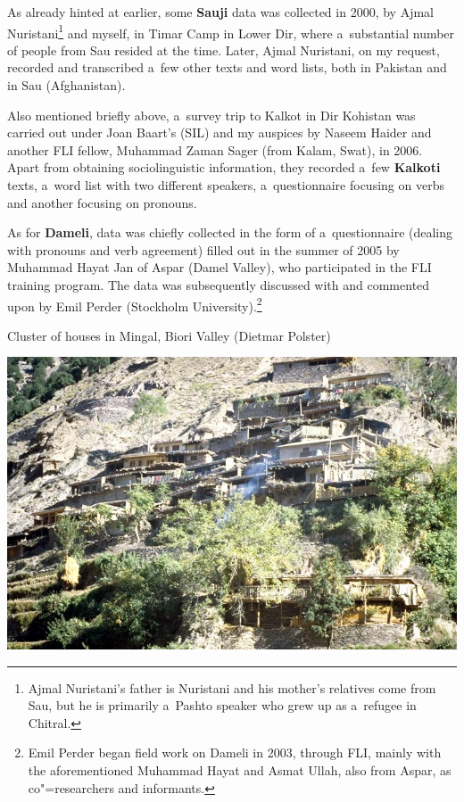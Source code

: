As already hinted at earlier, some \textbf{Sauji} data was collected in 2000, by Ajmal
Nuristani\footnote{Ajmal Nuristani's father is Nuristani and his mother's relatives come from Sau,
  but he is primarily a~Pashto speaker who grew up as a~refugee in Chitral.} and myself, in Timar
Camp in Lower Dir, where a~substantial number of people from Sau resided at the time. Later, Ajmal
Nuristani, on my request, recorded and transcribed a~few other texts and word lists, both in
Pakistan and in Sau (Afghanistan).


Also mentioned briefly above, a~survey trip to Kalkot in Dir Kohistan was carried out under Joan
Baart's (SIL) and my auspices by Naseem Haider and another FLI fellow, Muhammad Zaman Sager (from
Kalam, Swat), in 2006. Apart from obtaining sociolinguistic information, they recorded a~few
\textbf{Kalkoti} texts, a~word list with two different speakers, a~questionnaire focusing on verbs
and another focusing on pronouns.


As for \textbf{Dameli}, data was chiefly collected in the form of a~questionnaire (dealing with
pronouns and verb agreement) filled out in the summer of 2005 by Muhammad Hayat Jan of Aspar (Damel
Valley), who participated in the FLI training program. The data was subsequently discussed with and
commented upon by Emil Perder (Stockholm University).\footnote{Emil Perder began field work on
  Dameli in 2003, through FLI, mainly with the aforementioned Muhammad Hayat and Asmat Ullah, also
  from Aspar, as co"=researchers and informants.}


\begin{photofigure}[h!]
\caption{Cluster of houses in Mingal, Biori Valley (Dietmar Polster)}
\includegraphics[width=\textwidth]{figures/ch1photo2.jpg}
\end{photofigure}



